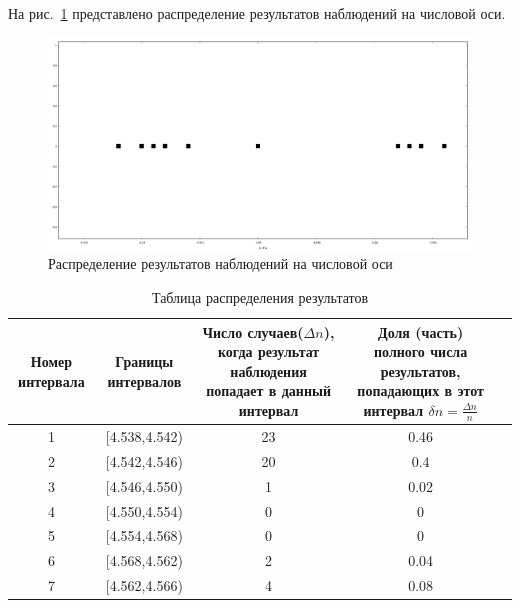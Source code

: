 На рис.~\ref{fig:graph2} представлено распределение результатов наблюдений на числовой оси.
\begin{figure}[H]
\centering
\includegraphics[width=1.0\textwidth]{graph2}
\caption{Распределение результатов наблюдений на числовой оси}
\label{fig:graph2}
\end{figure}
\begin{center}
\begin{table}[H]
\centering
\label{tabl:3}
\caption{Таблица распределения результатов}
\begin{tabular}{|c|c|c|c|c|}
\hline
\begin{minipage}{2cm}
    Номер интервала
\end{minipage}&
\begin{minipage}{3cm}
    Границы интервалов
\end{minipage} &
\begin{minipage}{5cm}
    Число случаев($\Delta n$), когда результат наблюдения попадает в данный интервал
\end{minipage} &
\begin{minipage}{5cm}
    Доля (часть) полного числа результатов, попадающих в этот интервал $\delta n=\frac{\Delta n}{n}$
\end{minipage}\\
\hline
1 &  [4.538,4.542)  &  23 & 0.46 \\
2 &  [4.542,4.546)  &  20 & 0.4 \\
3 &  [4.546,4.550)  &  1 & 0.02 \\
4 &  [4.550,4.554)  &  0 & 0 \\
5 &  [4.554,4.568) &  0 & 0 \\
6 &  [4.568,4.562)  &  2 & 0.04 \\
7 &  [4.562,4.566)  &  4 & 0.08 \\

\hline
\end{tabular}
\end{table}
\end{center}\\

